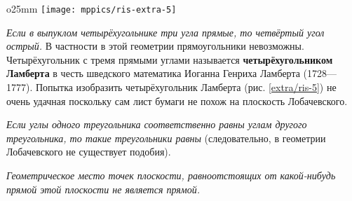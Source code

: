 \begin{wrapfigure}{o}{25mm}
\centering
\texttt{[image: mppics/ris-extra-5]}
\caption{}\label{extra/ris-5}
\end{wrapfigure}

\emph{Если в выпуклом четырёхугольнике три угла прямые, то четвёртый угол острый.} В частности в этой геометрии прямоугольники невозможны. %
Четырёхугольник с тремя прямыми углами называется \textbf{четырёхугольником Ламберта} в честь шведского математика Иоганна Генриха Ламберта (1728---1777).
Попытка изобразить четырёхугольник Ламберта (рис. \ref{extra/ris-5}) не очень удачная поскольку сам лист бумаги не похож на плоскость Лобачевского. %


\emph{Если углы одного треугольника соответственно равны углам другого треугольника, то такие треугольники равны} (следовательно, в геометрии Лобачевского не существует подобия).

\emph{Геометрическое место точек плоскости, равноотстоящих от какой-нибудь прямой этой плоскости не является прямой.}
